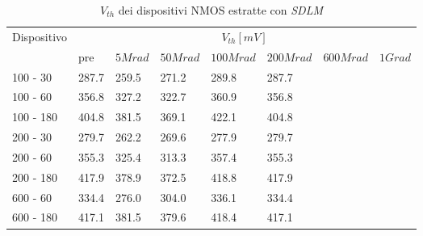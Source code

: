 \documentclass[12pt, letterpaper]{book}
\begin{document}
\begin{table}[H]
  \renewcommand{\arraystretch}{1.3}
  \begin{tabular}{m{2cm} m{0.8cm} m{1.1cm} m{1.3cm} m{1.5cm} m{1.5cm} m{1.5cm} m{1cm}}
    \toprule
    \multirow{2}{*}{Dispositivo} & \multicolumn{7}{c}{$V_{th} [mV] $}                                                                    \\
    \cmidrule{2-8}
                                 & pre                                & $5Mrad$ & $50Mrad$ & $100Mrad$ & $200Mrad$ & $600Mrad$ & $1Grad$ \\
    \midrule
    100 - 30                     & 287.7                              & 259.5   & 271.2    & 289.8     & 287.7     &           &         \\
    \hline
    100 - 60                     & 356.8                              & 327.2   & 322.7    & 360.9     & 356.8     &           &         \\
    \hline
    100 - 180                    & 404.8                              & 381.5   & 369.1    & 422.1     & 404.8     &           &         \\
    \hline
    200 - 30                     & 279.7                              & 262.2   & 269.6    & 277.9     & 279.7     &           &         \\
    \hline
    200 - 60                     & 355.3                              & 325.4   & 313.3    & 357.4     & 355.3     &           &         \\
    \hline
    200 - 180                    & 417.9                              & 378.9   & 372.5    & 418.8     & 417.9     &           &         \\
    \hline
    600 - 60                     & 334.4                              & 276.0   & 304.0    & 336.1     & 334.4     &           &         \\
    \hline
    600 - 180                    & 417.1                              & 381.5   & 379.6    & 418.4     & 417.1     &           &         \\
    \bottomrule
  \end{tabular}
  \caption{$V_{th}$ dei dispositivi NMOS estratte con \emph{SDLM}}
  \label{tab:VthSDLMN}
\end{table}
\end{document}
